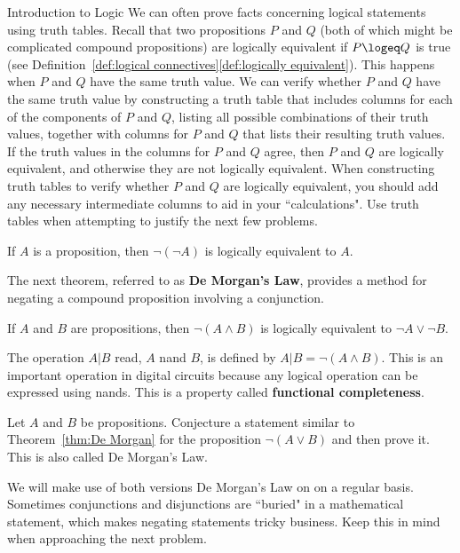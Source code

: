 \begin{section}{Introduction to Logic}
We can often prove facts concerning logical statements using truth
tables.  Recall that two propositions $P$ and $Q$ (both of which might
be complicated compound propositions) are logically equivalent if
$P\logeq Q$ is true (see Definition~\ref{def:logical
  connectives}\ref{def:logically equivalent}). This happens when $P$
and $Q$ have the same truth value. We can verify whether $P$ and $Q$
have the same truth value by constructing a truth table that includes
columns for each of the components of $P$ and $Q$, listing all
possible combinations of their truth values, together with columns for
$P$ and $Q$ that lists their resulting truth values.  If the truth
values in the columns for $P$ and $Q$ agree, then $P$ and $Q$ are
logically equivalent, and otherwise they are not logically equivalent.
When constructing truth tables to verify whether $P$ and $Q$ are
logically equivalent, you should add any necessary intermediate
columns to aid in your ``calculations". Use truth tables when
attempting to justify the next few problems.

\begin{theorem}
If $A$ is a proposition, then $\neg(\neg A)$ is logically equivalent to $A$.
\end{theorem}

The next theorem, referred to as \textbf{De Morgan's Law}, provides a
method for negating a compound proposition involving a conjunction.

\begin{theorem}\label{thm:De Morgan}
  If $A$ and $B$ are propositions, then $\neg(A \wedge B)$ is
  logically equivalent to $\neg A \vee \neg B$.
\end{theorem}

The operation $A | B$ read, $A$ nand $B$, is defined by $A | B = \neg
(A \wedge B)$. This is an important operation in digital circuits
because any logical operation can be expressed using nands. This is a
property called \textbf{functional completeness}.

\begin{problem}\label{prob:De Morgan}
Let $A$ and $B$ be propositions.  Conjecture a statement similar to Theorem~\ref{thm:De Morgan} for the proposition $\neg(A\vee B)$ and then prove it. This is also called De Morgan's Law.
\end{problem}

We will make use of both versions De Morgan's Law on on a regular basis. Sometimes conjunctions and disjunctions are ``buried" in a mathematical statement, which makes negating statements tricky business. Keep this in mind when approaching the next problem.


\end{section}
